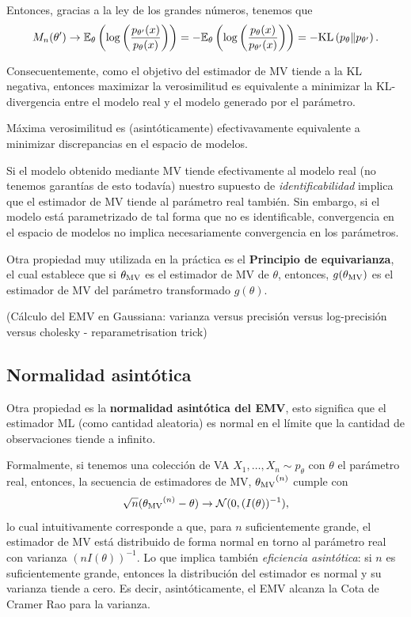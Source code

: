  Entonces, gracias a la ley de los grandes números, tenemos que 
 \begin{equation}
 	M_n(\theta') \rightarrow \mathbb{E}_\theta \left(\log\left(\frac{p_{\theta'}(x)}{p_{\theta}(x)}\right)\right) = -\mathbb{E}_\theta \left(\log\left(\frac{p_{\theta}(x)}{p_{\theta'}(x)}\right)\right) = -\text{KL}\left(p_\theta\middle\|p_{\theta'}\right).
 \end{equation}

 Consecuentemente, como el objetivo del estimador de MV tiende a la KL negativa, entonces maximizar la verosimilitud es equivalente a minimizar la KL-divergencia entre el modelo real y el modelo generado por el parámetro. 
\begin{remark}
 Máxima verosimilitud es (asintóticamente) efectivavamente equivalente a minimizar discrepancias en el espacio de modelos.
\end{remark}
 
\begin{remark}
 Si el modelo obtenido mediante MV tiende efectivamente al modelo real (no tenemos garantías de esto todavía) nuestro supuesto de \textit{identificabilidad} implica que el estimador de MV tiende al parámetro real también. Sin embargo, si el modelo está parametrizado de tal forma que no es identificable, convergencia en el espacio de modelos no implica necesariamente convergencia en los parámetros.   
\end{remark}
 
 


 Otra propiedad muy utilizada en la práctica es el \textbf{Principio de equivarianza}, el cual establece que si ${\theta_\text{MV}}$ es el estimador de MV de $\theta$, entonces, $g({\theta_\text{MV}})$ es el estimador de MV del parámetro transformado $g(\theta)$.

\begin{example}(Cálculo del EMV en Gaussiana: varianza versus precisión versus log-precisión versus cholesky - reparametrisation trick)
	
\end{example}

\subsection{Normalidad asintótica}

Otra propiedad es la \textbf{normalidad asintótica del EMV}, esto significa que el estimador ML (como cantidad aleatoria) es normal en el límite que la cantidad de  observaciones tiende a infinito. 

Formalmente, si tenemos una colección de VA $X_1,\ldots,X_n\sim p_\theta$ con $\theta$ el parámetro real, entonces, la secuencia de estimadores de MV, ${\theta_\text{MV}}^{(n)}$ cumple con 
\begin{equation}
	\sqrt{n}({\theta_\text{MV}}^{(n)}-\theta)\rightarrow {\mathcal N}(0,(I(\theta))^{-1}),
\end{equation}
lo cual intuitivamente corresponde a que, para $n$ suficientemente grande, el estimador de MV está distribuido de forma normal en torno al parámetro real con varianza $(nI(\theta))^{-1}$. Lo que implica también \textit{eficiencia asintótica}: si $n$ es suficientemente grande, entonces la distribución del estimador es normal y su varianza tiende a cero. Es decir, asintóticamente, el EMV alcanza la Cota de Cramer Rao para la varianza. 


